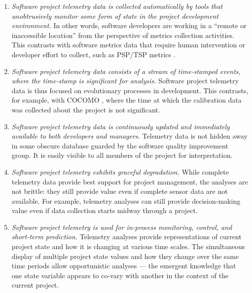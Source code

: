 \begin{enumerate}
\item \textit{Software project telemetry data is collected automatically by tools
   that unobtrusively monitor some form of state in the project
   development environment.}  In other words, software developers are
   working in a ``remote or inaccessible location'' from the perspective of
   metrics collection activities. This contrasts with software metrics data
   that require human intervention or developer effort to collect, such as
   PSP/TSP metrics \cite{Humphrey:1995}.
\item \textit{Software project telemetry data consists of a stream of
   time-stamped events, where the time-stamp is significant for analysis.}
   Software project telemetry data is thus focused on evolutionary
   processes in development.  This contrasts, for example, with COCOMO
   \cite{Cocomo:1981, Cocomo:2000}, where the time at which the calibration data was
   collected about the project is not significant.
\item \textit{Software project telemetry data is continuously updated and immediately 
   available to both developers and managers.}  Telemetry data is not hidden
   away in some obscure database guarded by the software quality improvement
   group.  It is easily visible to all members of the project for 
   interpretation. 
\item \textit{Software project telemetry exhibits graceful degradation.}
   While complete telemetry data provide best support for project
   management, the analyses are not brittle: they still provide
   value even if complete sensor data are not available. For example, 
   telemetry analyses can still provide decision-making
   value even if data collection starts midway through a project.      
\item \textit{Software project telemetry is used for in-process monitoring,
   control, and short-term prediction.} Telemetry analyses provide
   representations of current project state and how it is changing at
   various time scales.  The simultaneous display of multiple project state values and
   how they change over the same time periods allow opportunistic
   analyses --- the emergent knowledge that one state variable appears to
   co-vary with another in the context of the current project.
\end{enumerate}





